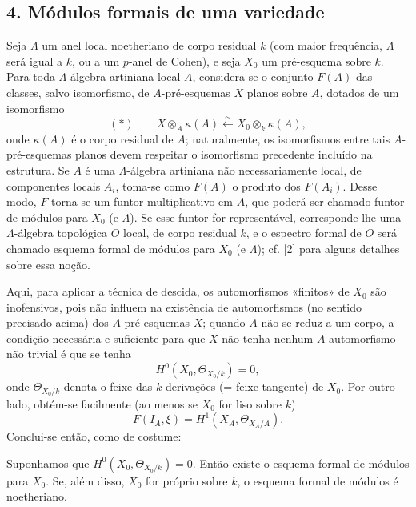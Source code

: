 \subsection*{4. Módulos formais de uma variedade}

Seja $\Lambda$ um anel local noetheriano de corpo residual $k$ (com maior
frequência, $\Lambda$ será igual a $k$, ou a um $p$-anel de Cohen), e seja
$X_0$ um pré-esquema sobre $k$. Para toda $\Lambda$-álgebra artiniana local $A$,
considera-se o conjunto $F(A)$ das classes, salvo isomorfismo, de
$A$-pré-esquemas $X$ planos sobre $A$, dotados de um isomorfismo
\[
  (*)\qquad
  X\otimes_A\kappa(A)\xleftarrow{\sim}
  X_0\otimes_k\kappa(A),
\]
onde $\kappa(A)$ é o corpo residual de $A$; naturalmente, os isomorfismos
entre tais $A$-pré-esquemas planos devem respeitar o isomorfismo precedente
incluído na estrutura. Se $A$ é uma $\Lambda$-álgebra artiniana não
necessariamente local, de componentes locais $A_i$, toma-se como $F(A)$ o
produto dos $F(A_i)$. Desse modo, $F$ torna-se um funtor
multiplicativo em $A$, que poderá ser chamado funtor de módulos para $X_0$ (e
$\Lambda$). Se esse funtor for representável, corresponde-lhe uma
$\Lambda$-álgebra topológica $O$ local, de corpo residual $k$, e o espectro
formal de $O$ será chamado esquema formal de módulos para $X_0$ (e $\Lambda$);
cf. [2] para alguns detalhes sobre essa noção.

Aqui, para aplicar a técnica de descida, os automorfismos «finitos» de $X_0$
são inofensivos, pois não influem na existência de automorfismos (no
sentido precisado acima) dos $A$-pré-esquemas $X$; quando $A$ não se
reduz a um corpo, a condição necessária e suficiente para que $X$ não tenha
nenhum $A$-automorfismo não trivial é que se tenha
\[
  H^0(X_0,\Theta_{X_0/k})=0,
\]
onde $\Theta_{X_0/k}$ denota o feixe das $k$-derivações (= feixe tangente)
de $X_0$. Por outro lado, obtém-se facilmente (ao menos se $X_0$ for liso
sobre $k$)
\[
  F(I_A,\xi)=H^1(X_A,\Theta_{X_A/A}).
\]
Conclui-se então, como de costume:

 Suponhamos que
$H^0(X_0,\Theta_{X_0/k})=0$. Então existe o esquema formal de módulos para
$X_0$. Se, além disso, $X_0$ for próprio sobre $k$, o esquema formal de módulos é
noetheriano.

